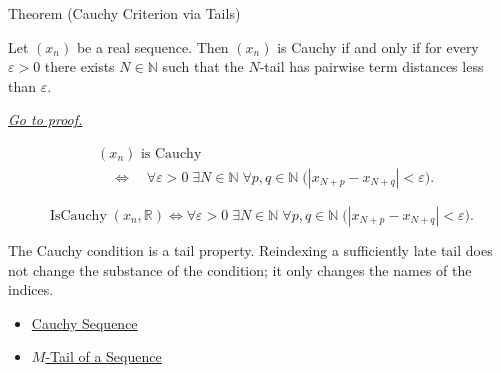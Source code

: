 
\begin{theorembox}{Theorem (Cauchy Criterion via Tails)}
\begin{theorem}
\label{thm:cauchy-criterion-via-tails}
Let $(x_n)$ be a real sequence. Then $(x_n)$ is Cauchy if and only if
for every $\varepsilon>0$ there exists $N\in\mathbb{N}$ such that the
$N$-tail has pairwise term distances less than $\varepsilon$.

\smallskip
\noindent
\hyperref[prf:cauchy-criterion-via-tails]{\textit{Go to proof.}}
\end{theorem}
\end{theorembox}

\begin{remark*}
\[
\begin{aligned}
&(x_n)\text{ is Cauchy}\\
&\quad\Longleftrightarrow\quad
\forall \varepsilon>0\;\exists N\in\mathbb{N}\;\forall p,q\in\mathbb{N}
\;\bigl(|x_{N+p}-x_{N+q}|<\varepsilon\bigr).
\end{aligned}
\]
\end{remark*}

\begin{remark*}
\[
\operatorname{IsCauchy}(x_n,\mathbb{R})
\Longleftrightarrow
\forall \varepsilon>0\;\exists N\in\mathbb{N}\;\forall p,q\in\mathbb{N}
\;\bigl(|x_{N+p}-x_{N+q}|<\varepsilon\bigr).
\]
\end{remark*}

\begin{remark*}[Interpretation]
The Cauchy condition is a tail property. Reindexing a sufficiently late tail
does not change the substance of the condition; it only changes the names of
the indices.
\end{remark*}

\begin{dependencies}
\begin{itemize}
  \item \hyperref[def:cauchy-sequence]{Cauchy Sequence}
  \item \hyperref[def:m-tail]{$M$-Tail of a Sequence}
\end{itemize}
\end{dependencies}

